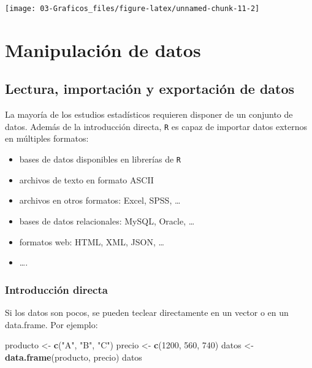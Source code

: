 \documentclass[]{book}
\newenvironment{Shaded}{\begin{snugshade}}{\end{snugshade}}
\newcommand{\KeywordTok}[1]{\textcolor[rgb]{0.13,0.29,0.53}{\textbf{#1}}}
\newcommand{\DecValTok}[1]{\textcolor[rgb]{0.00,0.00,0.81}{#1}}
\newcommand{\StringTok}[1]{\textcolor[rgb]{0.31,0.60,0.02}{#1}}
\newcommand{\NormalTok}[1]{#1}
\begin{document}
\begin{center}\texttt{[image: 03-Graficos\_files/figure-latex/unnamed-chunk-11-2]} \end{center}

\chapter{Manipulación de datos}\label{manipulacion-de-datos}

\section{Lectura, importación y exportación de
datos}\label{lectura-importacion-y-exportacion-de-datos}

La mayoría de los estudios estadísticos requieren disponer de un
conjunto de datos. Además de la introducción directa, \texttt{R} es
capaz de importar datos externos en múltiples formatos:

\begin{itemize}
\item
  bases de datos disponibles en librerías de \texttt{R}
\item
  archivos de texto en formato ASCII
\item
  archivos en otros formatos: Excel, SPSS, \ldots{}
\item
  bases de datos relacionales: MySQL, Oracle, \ldots{}
\item
  formatos web: HTML, XML, JSON, \ldots{}
\item
  \ldots{}.
\end{itemize}

\subsection{Introducción directa}\label{introduccion-directa}

Si los datos son pocos, se pueden teclear directamente en un vector o en
un data.frame. Por ejemplo:

\begin{Shaded}
\begin{Highlighting}[]
\NormalTok{producto <-}\StringTok{ }\KeywordTok{c}\NormalTok{(}\StringTok{"A"}\NormalTok{, }\StringTok{"B"}\NormalTok{, }\StringTok{"C"}\NormalTok{)}
\NormalTok{precio <-}\StringTok{ }\KeywordTok{c}\NormalTok{(}\DecValTok{1200}\NormalTok{, }\DecValTok{560}\NormalTok{, }\DecValTok{740}\NormalTok{)}
\NormalTok{datos <-}\StringTok{ }\KeywordTok{data.frame}\NormalTok{(producto, precio)}
\NormalTok{datos}
\end{Highlighting}
\end{Shaded}
\end{document}
